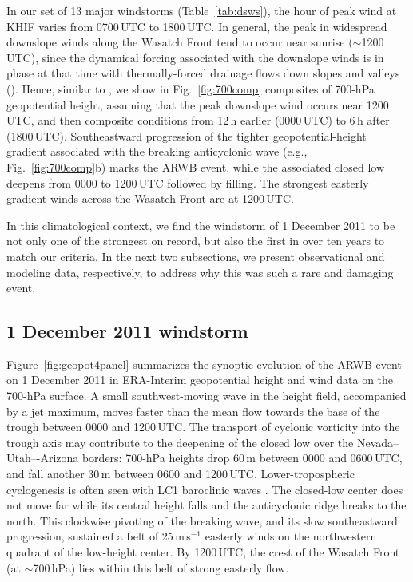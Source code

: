 \documentclass[pdftex,12pt]{article}
\def\mps{m\,s$^{-1}$}
\def\around{$\sim$}
\begin{document}
In our set of 13 major windstorms (Table~\ref{tab:dsws}), the hour of peak wind at KHIF varies from 0700\,UTC to 1800\,UTC. In general, the peak in widespread downslope winds along the Wasatch Front tend to occur near sunrise (\around 1200\,UTC), since the dynamical forcing associated with the downslope winds is in phase at that time with thermally-forced drainage flows down slopes and valleys (\citealt{Chrust2013}). Hence, similar to \citet{Holland2002}, we show in Fig.~\ref{fig:700comp} composites of 700-hPa geopotential height, assuming that the peak downslope wind occurs near 1200\,UTC, and then composite conditions from 12\,h earlier (0000\,UTC) to 6\,h after (1800\,UTC). Southeastward progression of the tighter geopotential-height gradient associated with the breaking anticyclonic wave (e.g.,  Fig.~\ref{fig:700comp}b) marks the ARWB event, while the associated closed low deepens from 0000 to 1200\,UTC followed by filling. The strongest easterly gradient winds across the Wasatch Front are at 1200\,UTC.

In this climatological context, we find the windstorm of 1 December 2011 to be not only one of the strongest on record, but also the first in over ten years to match our criteria. In the next two subsections, we present observational and modeling data, respectively, to address why this was such a rare and damaging event.

\subsection{1 December 2011 windstorm}
Figure~\ref{fig:geopot4panel} summarizes the synoptic evolution of the ARWB event on 1 December 2011 in ERA-Interim geopotential height and wind data on the 700-hPa surface.  A small southwest-moving wave in the height field, accompanied by a jet maximum, moves faster than the mean flow towards the base of the trough between 0000 and 1200\,UTC. The transport of cyclonic vorticity into the trough axis may contribute to the deepening of the closed low over the Nevada--Utah–-Arizona borders: 700-hPa heights drop 60\,m between 0000 and 0600\,UTC, and fall another 30\,m between 0600 and 1200\,UTC. Lower-tropospheric cyclogenesis is often seen with LC1 baroclinic waves \citep{Thorncroft1993}. The closed-low center does not move far while its central height falls and the anticyclonic ridge breaks to the north. This clockwise pivoting of the breaking wave, and its slow southeastward progression, sustained a belt of 25\,\mps{} easterly winds on the northwestern quadrant of the low-height center. By 1200\,UTC, the crest of the Wasatch Front (at \around 700\,hPa) lies within this belt of strong easterly flow.
\end{document}
